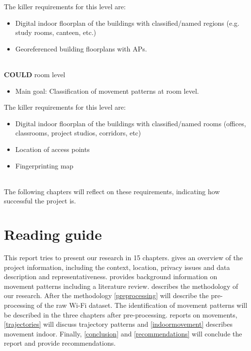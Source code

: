 The killer requirements for this level are:
\begin{itemize}
\item Digital indoor floorplan of the buildings with classified/named regions (e.g. study rooms, canteen, etc.)
\item Georeferenced building floorplans with APs.\\\\
\end{itemize}
\textbf{COULD} room level
\begin{itemize}
\item {\color{black!50}Main goal: Classification of movement patterns at room level.}
\end{itemize}
The killer requirements for this level are:
\begin{itemize}
\item {\color{black!50}Digital indoor floorplan of the buildings with classified/named rooms (offices, classrooms, project studios, corridors, etc)}
\item {\color{black!50}Location of access points}
\item {\color{black!50}Fingerprinting map}\\\\
\end{itemize}
The following chapters will reflect on these requirements, indicating how successful the project is.
\pagebreak

\section{Reading guide}
This report tries to present our research in 15 chapters.  gives an overview of the project information, including the context, location, privacy issues and data description and representativeness.  provides background information on movement patterns including a literature review.  describes the methodology of our research. After the methodology \cref{preprocessing} will describe the pre-processing of the raw Wi-Fi dataset. The identification of movement patterns will be described in the three chapters after pre-processing.  reports on movements, \cref{trajectories} will discuss trajectory patterns and \cref{indoormovement} describes movement indoor. Finally, \cref{conclusion} and \cref{recommendations} will conclude the report and provide recommendations.

